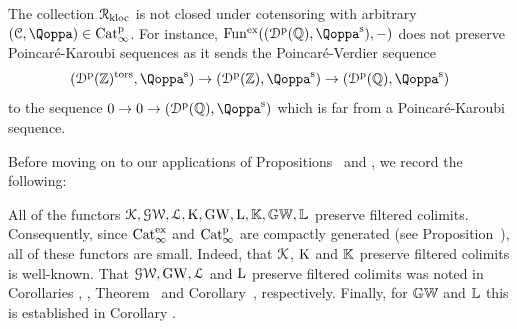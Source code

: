 \begin{remark}
\label{rem:contensor-does-not-preserve-KS}%
The collection $\mathcal{R}_{\mathrm{kloc}}$ is not closed under cotensoring with arbitrary $(\C,\QF) \in \Catp$. For instance, $\Funx((\Dperf(\QQ),\QF^\sym),-)$ does not preserve Poincar\'e-Karoubi sequences as it sends the Poincar\'e-Verdier sequence 
\[
(\Dperf(\ZZ)^\mathrm{tors},\QF^\s) \to (\Dperf(\ZZ),\QF^\s) \to (\Dperf(\QQ),\QF^\s)
\]
to the sequence $0 \to 0 \to (\Dperf(\QQ),\QF^\s)$ which is far from a Poincar\'e-Karoubi sequence. 
\end{remark}

Before moving on to our applications of Propositions~ and ,
we record the following:
\begin{remark}
\label{remark:small-functors}%
All of the functors $\operatorname{\mathcal{K}},\operatorname{\mathcal{GW}},\operatorname{\mathcal{L}},\operatorname K,\operatorname{GW},\operatorname L,\mathbb K,\mathbb{GW},\mathbb{L}$ preserve filtered colimits. Consequently, since $\mathrm{Cat}_\infty^{\mathrm{ex}}$ and $\mathrm{Cat}^{\mathrm p}_\infty$ are compactly generated (see Proposition~), all of these functors are small. Indeed, that $\operatorname{\mathcal{K}}$, $\operatorname K$ and $\mathbb K$ preserve filtered colimits is well-known. That $\operatorname{\mathcal{GW}},\operatorname{GW},\operatorname{\mathcal{L}}$ and $\operatorname L$ preserve filtered colimits was noted in Corollaries , , Theorem~ and Corollary~, respectively. Finally, for $\mathbb{GW}$ and $\mathbb{L}$ this is established in Corollary .
\end{remark}












